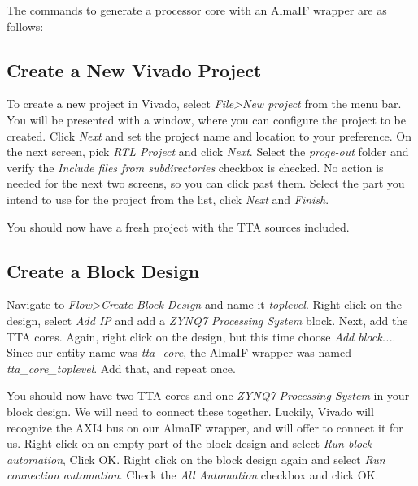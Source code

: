 \documentclass[twoside]{tceusermanual}
\begin{document}
The commands to generate a processor core with an AlmaIF wrapper are as follows:



\subsection{Create a New Vivado Project}

To create a new project in Vivado, select \textit{File>New project} from the
menu bar. You will be presented with a window, where you can configure the
project to be created. Click \textit{Next} and set the project name and location
to your preference. On the next screen, pick \textit{RTL Project} and click
\textit{Next}. Select the \textit{proge-out} folder and verify the
\textit{Include files from subdirectories} checkbox is checked. No action is
needed for the next two screens, so you can click past them. Select the part
you intend to use for the project from the list, click \textit{Next} and
\textit{Finish}.

You should now have a fresh project with the TTA sources included.

\subsection{Create a Block Design}

Navigate to \textit{Flow>Create Block Design} and name it \textit{toplevel}.
Right click on the design, select \textit{Add IP} and add a \textit{ZYNQ7
Processing System} block. Next, add the TTA cores. Again, right click on the
design, but this time choose \textit{Add block...}. Since our entity name
was \textit{tta\_core}, the AlmaIF wrapper was named
\textit{tta\_core\_toplevel}. Add that, and repeat once.

You should now have two TTA cores and one \textit{ZYNQ7 Processing System} in
your block design. We will need to connect these together. Luckily, Vivado
will recognize the AXI4 bus on our AlmaIF wrapper, and will offer to connect
it for us. Right click on an empty part of the block design and select
\textit{Run block automation}, Click OK. Right click on the block design again
and select \textit{Run connection automation}. Check  the
\textit{All Automation} checkbox and click OK.
\end{document}
